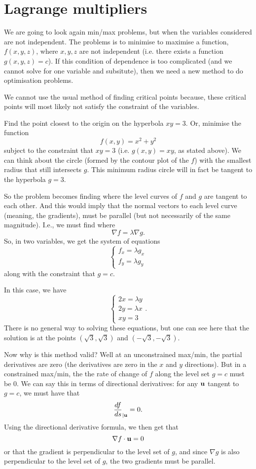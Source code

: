 \section{Lagrange multipliers}

We are going to look again min/max problems, but when the variables considered are not independent. The problems is to minimise to maximise a function, $f(x,y,z)$, where $x,y,z$ are not independent (i.e. there exists a function $g(x,y,z)=c$). If this condition of dependence is too complicated (and we cannot solve for one variable and subsitute), then we need a new method to do optimisation problems.

We cannot use the usual method of finding critical points because, these critical points will most likely not satisfy the constraint of the variables. 

\bex
Find the point closest to the origin on the hyperbola $xy=3$. Or, minimise the function
\[ f(x,y)=x^2+y^2 \]
subject to the constraint that $xy=3$ (i.e. $g(x,y)=xy$, as stated above). We can think about the circle (formed by the contour plot of the $f$) with the smallest radius that still intersects $g$. This minimum radius circle will in fact be tangent to the hyperbola $g=3$.

So the problem becomes finding where the level curves of $f$ and $g$ are tangent to each other. And this would imply that the normal vectors to each level curve (meaning, the gradients), must be parallel (but not necessarily of the same magnitude). I.e., we must find where 
\[ \nabla f = \lambda \nabla g. \]
So, in two variables, we get the system of equations
\[ \begin{cases} f_x = \lambda g_x \\ f_y = \lambda g_y \end{cases} \]
along with the constraint that $g = c$. 

In this case, we have
\[ \begin{cases} 2x = \lambda y \\ 2y = \lambda x \\ xy = 3 \end{cases}. \]
There is no general way to solving these equations, but one can see here that the solution is at the points $(\sqrt{3},\sqrt{3})$ and $(-\sqrt{3}, -\sqrt{3})$.
\eex

Now why is this method valid? Well at an unconstrained max/min, the partial derivatives are zero (the derivatives are zero in the $x$ and $y$ directions). But in a constrained max/min, the the rate of change of $f$ along the level set $g=c$ must be 0. We can say this in terms of directional derivatives: for any $\boldsymbol{\mathbf{u}}$ tangent to $g=c$, we must have that
\[ \frac{df}{ds}_{|\boldsymbol{\mathbf{u}}} = 0. \]
Using the directional derivative formula, we then get that 
\[ \nabla f \cdot \boldsymbol{\mathbf{u}} = 0 \]
or that the gradient is perpendicular to the level set of $g$, and since $\nabla g$ is also perpendicular to the level set of $g$, the two gradients must be parallel. 

